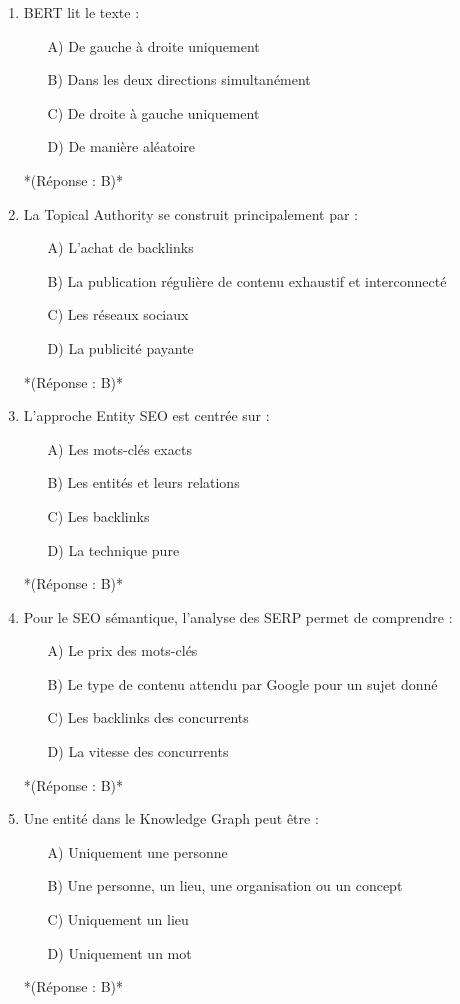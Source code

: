 \documentclass[12pt,a4paper,twoside]{report}
\begin{document}
\begin{enumerate}
\item BERT lit le texte :
\begin{itemize}
\item[A)] De gauche à droite uniquement
\item[B)] Dans les deux directions simultanément
\item[C)] De droite à gauche uniquement
\item[D)] De manière aléatoire
\end{itemize}
*(Réponse : B)*

\item La Topical Authority se construit principalement par :
\begin{itemize}
\item[A)] L'achat de backlinks
\item[B)] La publication régulière de contenu exhaustif et interconnecté
\item[C)] Les réseaux sociaux
\item[D)] La publicité payante
\end{itemize}
*(Réponse : B)*

\item L'approche Entity SEO est centrée sur :
\begin{itemize}
\item[A)] Les mots-clés exacts
\item[B)] Les entités et leurs relations
\item[C)] Les backlinks
\item[D)] La technique pure
\end{itemize}
*(Réponse : B)*

\item Pour le SEO sémantique, l'analyse des SERP permet de comprendre :
\begin{itemize}
\item[A)] Le prix des mots-clés
\item[B)] Le type de contenu attendu par Google pour un sujet donné
\item[C)] Les backlinks des concurrents
\item[D)] La vitesse des concurrents
\end{itemize}
*(Réponse : B)*

\item Une entité dans le Knowledge Graph peut être :
\begin{itemize}
\item[A)] Uniquement une personne
\item[B)] Une personne, un lieu, une organisation ou un concept
\item[C)] Uniquement un lieu
\item[D)] Uniquement un mot
\end{itemize}
*(Réponse : B)*


\end{enumerate}
\end{document}
